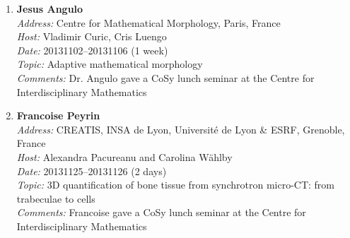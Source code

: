 \begin{enumerate}




\item 
{\bf Jesus Angulo}~\\
{\em Address:} Centre for Mathematical Morphology, Paris, France~\\
{\em Host:} Vladimir Curic, Cris Luengo~\\
{\em Date:} 20131102--20131106 (1 week)~\\
{\em Topic:} Adaptive mathematical morphology~\\
{\em Comments:} Dr. Angulo gave a CoSy lunch seminar at the Centre for Interdisciplinary Mathematics

\item 
{\bf Francoise Peyrin}~\\
{\em Address:} CREATIS, INSA de Lyon, Universit\'{e} de Lyon \& ESRF, Grenoble, France~\\
{\em Host:} Alexandra Pacureanu and Carolina W\"{a}hlby~\\
{\em Date:} 20131125--20131126 (2 days)~\\
{\em Topic:} 3D quantification of bone tissue from synchrotron micro-CT: from trabeculae to cells~\\
{\em Comments:} Francoise gave a CoSy lunch seminar at the Centre for Interdisciplinary Mathematics


\end{enumerate}

